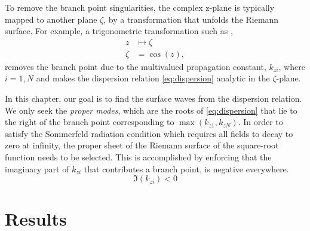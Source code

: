 To remove the branch point singularities, the complex z-plane is typically mapped to another plane $\zeta$, by a transformation that unfolds the Riemann surface. For example, a trigonometric transformation such as \cite{Michalski2006,Polimeridis_2007},
%
\begin{equation}
  \begin{split}
    z &\mapsto \zeta \\
    \zeta &= \cos (z),
  \end{split}
  \label{eq:mapping}%
\end{equation}
%
removes the branch point due to the multivalued propagation constant, $k_{zi}$, where $i = 1,N$ and makes the dispersion relation \eqref{eq:dispersion} analytic in the $\zeta$-plane.
%
%

In this chapter, our goal is to find the surface waves from the dispersion relation. We only seek the \emph{proper modes}, which are the roots of \eqref{eq:dispersion} that lie to the right of the branch point corresponding to $\max(k_{z1},k_{zN})$. In order to satisfy the Sommerfeld radiation condition which requires all fields to decay to zero at infinity, the proper sheet of the Riemann surface of the square-root function needs to be selected. This is accomplished by enforcing that the imaginary part of $k_{zi}$ that contributes a branch point, is negative everywhere.
%
\begin{equation}
  \Im (k_{zi}) < 0
  \label{eq:proper}
\end{equation}
%
\section{Results}
%
